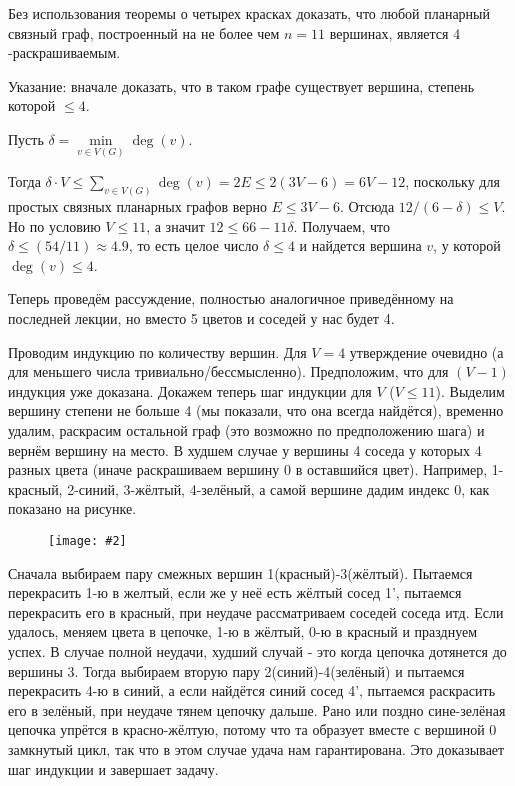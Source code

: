 \documentclass[a4paper,12pt]{article}
\numberwithin{figure}{section}
\newcommand\CenterFigure[2]{\begin{figure}[H]\centering\texttt{[image: \#2]}\end{figure}}
\begin{document}
\begin{problem}
	Без использования теоремы о четырех красках доказать, что любой планарный связный граф, построенный на не более чем $n=11$ вершинах, является $4$-раскрашиваемым.
	
	Указание: вначале доказать, что в таком графе существует вершина, степень которой $\leqslant 4$.
\end{problem}
\begin{solution}
	Пусть $\delta = \min \limits_{v \in V(G)} \deg(v)$.
	
	Тогда $\delta \cdot V \leqslant \sum \limits_{v \in V(G)} {\deg(v)}
	      = 2E \leqslant 2(3V-6) = 6V-12$,
	поскольку для простых связных планарных графов верно $E \leqslant 3V-6$.
	Отсюда $ 12 / (6 - \delta) \leqslant V$.
	Но по условию $V \leqslant 11$, а значит $12 \leqslant 66 - 11 \delta$.
	Получаем, что $\delta \leqslant (54 / 11) \approx 4.9$,
	то есть целое число $\delta \leqslant 4$
	и найдется вершина $v$, у которой $\deg(v) \leqslant 4$.
	
	Теперь проведём рассуждение, полностью аналогичное приведённому на последней лекции, но вместо 5 цветов и соседей у нас будет 4.
	
	Проводим индукцию по количеству вершин. Для $V=4$ утверждение очевидно (а для меньшего числа тривиально/бессмысленно). Предположим, что для $(V-1)$ индукция уже доказана. Докажем теперь шаг индукции для $V$ ($V \leqslant 11$). Выделим вершину степени не больше 4 (мы показали, что она всегда найдётся), временно удалим, раскрасим остальной граф (это возможно по предположению шага) и вернём вершину на место. В худшем случае у вершины 4 соседа у которых 4 разных цвета (иначе раскрашиваем вершину 0 в оставшийся цвет). Например, 1-красный, 2-синий, 3-жёлтый, 4-зелёный, а самой вершине дадим индекс 0, как показано на рисунке.

		\CenterFigure{8cm}{stepik-lesson12347-step8-problem.png}

	Сначала выбираем пару смежных вершин 1(красный)-3(жёлтый). Пытаемся перекрасить 1-ю в желтый, если же у неё есть жёлтый сосед 1', пытаемся перекрасить его в красный, при неудаче рассматриваем соседей соседа итд. Если удалось, меняем цвета в цепочке, 1-ю в жёлтый, 0-ю в красный и празднуем успех. В случае полной неудачи, худший случай - это когда цепочка дотянется до вершины 3. Тогда выбираем вторую пару 2(синий)-4(зелёный) и пытаемся перекрасить 4-ю в синий, а если найдётся синий сосед 4', пытаемся раскрасить его в зелёный, при неудаче тянем цепочку дальше. Рано или поздно сине-зелёная цепочка упрётся в красно-жёлтую, потому что та образует вместе с вершиной 0 замкнутый цикл, так что в этом случае удача нам гарантирована. Это доказывает шаг индукции и завершает задачу.
\end{solution}
\end{document}
